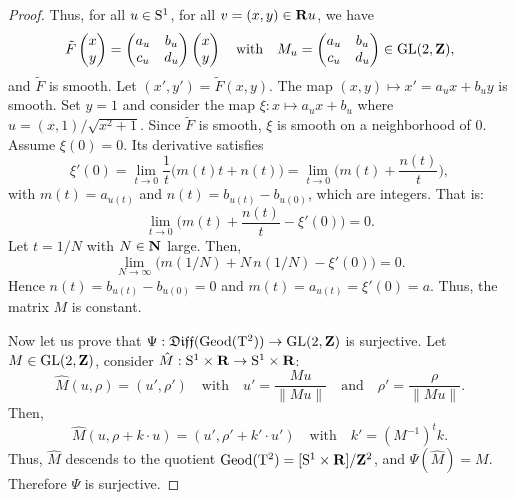 \begin{proof}
  Thus,
  for all $u \in \mathrm{S}^1$,
  for all $v = (x,y) \in \mathbf{R} u$,
  we have
  $$%
    \tilde F \Vector{x \\ y} = \Vector{a_u & b_u \\ c_u & d_u} \Vector{x \\ y}
    \quad \text{with} \quad
    M_u = \Vector{a_u & b_u \\ c_u & d_u} \in \GL(2,\ZZ),
    $$%
  and $\tilde F$ is smooth.
  Let $(x',y') = \tilde F(x,y)$.
  The map $(x,y) \mapsto x' = a_u x + b_u y$ is smooth.
  Set $y = 1$ and consider the map $\xi : x \mapsto a_u x + b_u$ where $u = (x,1)/\sqrt{x^2 + 1}$.
  Since $\tilde F$ is smooth,
  $\xi$ is smooth on a neighborhood of $0$.
  Assume $\xi(0) = 0$.
  Its derivative satisfies
  $$%
    \xi'(0) = \lim_{t \to 0} \frac{1}{t} \big(m(t) t + n(t)\big) = \lim_{t \to 0} \bigg( m(t) + \frac{n(t)}{t} \bigg),
    $$%
  with $m(t) = a_{u(t)}$ and $n(t) = b_{u(t)} - b_{u(0)}$, which are integers.
  That is:
  $$%
    \lim_{t \to 0} \bigg( m(t) + \frac{n(t)}{t} - \xi'(0) \bigg) = 0.
    $$%
  Let $t = 1/N$ with $N \in \mathbf{N}$ large.
  Then,
  $$%
    \lim_{N \to \infty} \bigg(m(1/N) + N\, n(1/N) - \xi'(0)\bigg) = 0.
    $$%
  Hence $n(t) = b_{u(t)} - b_{u(0)} = 0$ and $m(t) = a_{u(t)} = \xi'(0) = a$.
  Thus,
  the matrix $M$ is constant.
  
  Now let us prove that $\Psi : \mathfrak{Diff}(\operatorname{Geod}(\mathrm{T}^2)) \to \mathrm{GL}(2,\mathbf{Z})$ is surjective.
  Let $M \in \mathrm{GL}(2,\mathbf{Z})$,
  consider $\hat M : \mathrm{S}^1 \times \mathbf{R} \to \mathrm{S}^1 \times \mathbf{R}$:
  $$%
    \hat M(u,\rho) = (u',\rho')
    \quad \text{with} \quad
    u' = \frac{M u}{\|M u\|}
    \quad \text{and} \quad
    \rho' = \frac{\rho}{\|M u\|}.
    $$%
  Then,
  $$%
    \hat M(u, \rho + k \cdot u) = (u', \rho' + k' \cdot u')
    \quad \text{with} \quad
    k' = (M^{-1})^t k.
    $$%
  Thus,
  $\hat M$ descends to the quotient $\operatorname{Geod}(\mathrm{T}^2) = [\mathrm{S}^1 \times \mathbf{R}]/\mathbf{Z}^2$,
  and $\Psi(\hat M) = M$.
  Therefore $\Psi$ is surjective.
\end{proof}

